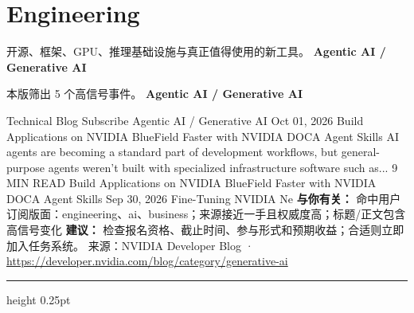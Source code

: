 \documentclass[10.5pt]{ctexart}
\begin{document}
\section*{Engineering}
{\color{ormuted} 开源、框架、GPU、推理基础设施与真正值得使用的新工具。}
\vspace{2mm}
{\LARGE\bfseries Agentic AI / Generative AI}\par
\vspace{1mm}
{\color{ormuted} 本版筛出 5 个高信号事件。}
\vspace{3mm}
{\Large\bfseries Agentic AI / Generative AI}\par
Technical Blog Subscribe Agentic AI / Generative AI Oct 01, 2026 Build Applications on NVIDIA BlueField Faster with NVIDIA DOCA Agent Skills AI agents are becoming a standard part of development workflows, but general-purpose agents weren't built with specialized infrastructure software such as... 9 MIN READ Build Applications on NVIDIA BlueField Faster with NVIDIA DOCA Agent Skills Sep 30, 2026 Fine-Tuning NVIDIA Ne
\textbf{与你有关：} 命中用户订阅版面：engineering、ai、business；来源接近一手且权威度高；标题/正文包含高信号变化
\textbf{建议：} 检查报名资格、截止时间、参与形式和预期收益；合适则立即加入任务系统。
{\footnotesize\color{ormuted} 来源：NVIDIA Developer Blog · \url{https://developer.nvidia.com/blog/category/generative-ai}}
\vspace{4mm}
\hrule height 0.25pt
\vspace{3mm}
\end{document}
